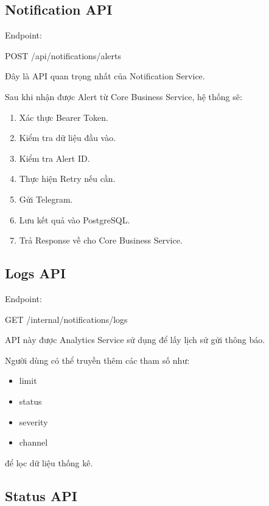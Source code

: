 \subsection{Notification API}

Endpoint:

\begin{center}
POST /api/notifications/alerts
\end{center}

Đây là API quan trọng nhất của Notification Service.

Sau khi nhận được Alert từ Core Business Service, hệ thống sẽ:

\begin{enumerate}
\item Xác thực Bearer Token.
\item Kiểm tra dữ liệu đầu vào.
\item Kiểm tra Alert ID.
\item Thực hiện Retry nếu cần.
\item Gửi Telegram.
\item Lưu kết quả vào PostgreSQL.
\item Trả Response về cho Core Business Service.
\end{enumerate}

\subsection{Logs API}

Endpoint:

\begin{center}
GET /internal/notifications/logs
\end{center}

API này được Analytics Service sử dụng để lấy lịch sử gửi thông báo.

Người dùng có thể truyền thêm các tham số như:

\begin{itemize}
\item limit
\item status
\item severity
\item channel
\end{itemize}

để lọc dữ liệu thống kê.

\subsection{Status API}

